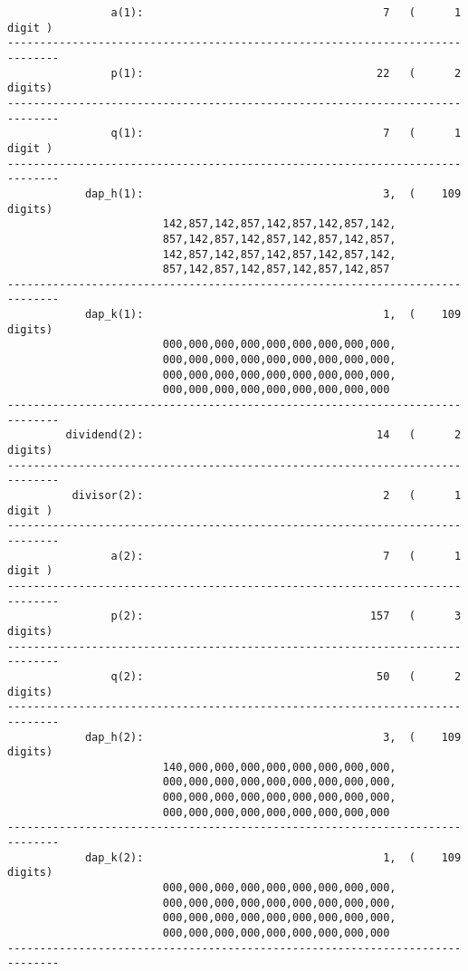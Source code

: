 \begin{dosutilcommandsampleinvocations}
\begin{scriptsize}
\begin{verbatim}
                a(1):                                     7   (      1 digit )
------------------------------------------------------------------------------
                p(1):                                    22   (      2 digits)
------------------------------------------------------------------------------
                q(1):                                     7   (      1 digit )
------------------------------------------------------------------------------
            dap_h(1):                                     3,  (    109 digits)
                        142,857,142,857,142,857,142,857,142,
                        857,142,857,142,857,142,857,142,857,
                        142,857,142,857,142,857,142,857,142,
                        857,142,857,142,857,142,857,142,857
------------------------------------------------------------------------------
            dap_k(1):                                     1,  (    109 digits)
                        000,000,000,000,000,000,000,000,000,
                        000,000,000,000,000,000,000,000,000,
                        000,000,000,000,000,000,000,000,000,
                        000,000,000,000,000,000,000,000,000
------------------------------------------------------------------------------
         dividend(2):                                    14   (      2 digits)
------------------------------------------------------------------------------
          divisor(2):                                     2   (      1 digit )
------------------------------------------------------------------------------
                a(2):                                     7   (      1 digit )
------------------------------------------------------------------------------
                p(2):                                   157   (      3 digits)
------------------------------------------------------------------------------
                q(2):                                    50   (      2 digits)
------------------------------------------------------------------------------
            dap_h(2):                                     3,  (    109 digits)
                        140,000,000,000,000,000,000,000,000,
                        000,000,000,000,000,000,000,000,000,
                        000,000,000,000,000,000,000,000,000,
                        000,000,000,000,000,000,000,000,000
------------------------------------------------------------------------------
            dap_k(2):                                     1,  (    109 digits)
                        000,000,000,000,000,000,000,000,000,
                        000,000,000,000,000,000,000,000,000,
                        000,000,000,000,000,000,000,000,000,
                        000,000,000,000,000,000,000,000,000
------------------------------------------------------------------------------
\end{verbatim}
\end{scriptsize}


\end{dosutilcommandsampleinvocations}
